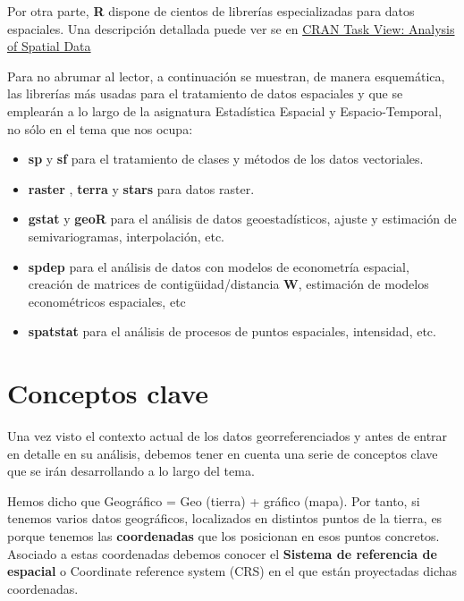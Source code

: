 \documentclass[
]{book}
\theoremstyle{definition}
\theoremstyle{definition}
\theoremstyle{definition}
\theoremstyle{definition}
\theoremstyle{remark}
\begin{document}
Por otra parte, \textbf{R} dispone de cientos de librerías especializadas para datos
espaciales. Una descripción detallada puede ver se en \href{https://cran.r-project.org/web/views/Spatial.html}{CRAN Task View: Analysis
of Spatial Data}

Para no abrumar al lector, a continuación se muestran, de manera esquemática,
las librerías más usadas para el tratamiento de datos espaciales y que se
emplearán a lo largo de la asignatura Estadística Espacial y Espacio-Temporal,
no sólo en el tema que nos ocupa:

\begin{itemize}
\item
  \textbf{sp} \citep{R-sp} y \textbf{sf} \citep{R-sp} para el tratamiento de clases y métodos de
  los datos vectoriales.
\item
  \textbf{raster} \citep{R-raster}, \textbf{terra} \citep{R-terra}y \textbf{stars} \citep{R-stars}para datos
  raster.
\item
  \textbf{gstat} \citep{R-gstat} y \textbf{geoR} \citep{R-geor} para el análisis de datos
  geoestadísticos, ajuste y estimación de semivariogramas, interpolación, etc.
\item
  \textbf{spdep} \citep{R-spdep} para el análisis de datos con modelos de econometría
  espacial, creación de matrices de contigüidad/distancia \textbf{W}, estimación de
  modelos econométricos espaciales, etc
\item
  \textbf{spatstat} \citep{spatstat_2005}para el análisis de procesos de puntos
  espaciales, intensidad, etc.
\end{itemize}

\hypertarget{conceptos-clave}{%
\section{Conceptos clave}\label{conceptos-clave}}

Una vez visto el contexto actual de los datos georreferenciados y antes de
entrar en detalle en su análisis, debemos tener en cuenta una serie de conceptos
clave que se irán desarrollando a lo largo del tema.

Hemos dicho que Geográfico = Geo (tierra) + gráfico (mapa). Por tanto, si
tenemos varios datos geográficos, localizados en distintos puntos de la tierra,
es porque tenemos las \textbf{coordenadas} que los posicionan en esos puntos
concretos. Asociado a estas coordenadas debemos conocer el \textbf{Sistema de
referencia de espacial} o Coordinate reference system (CRS) en el que están
proyectadas dichas coordenadas.
\end{document}
